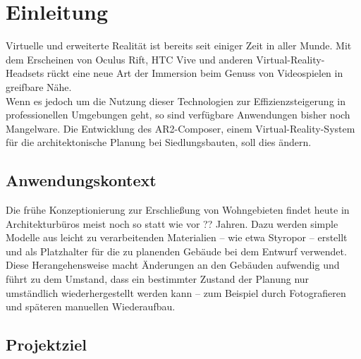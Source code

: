 \section{Einleitung}
Virtuelle und erweiterte Realität ist bereits seit einiger Zeit in aller Munde. Mit dem Erscheinen von Oculus Rift, HTC Vive und anderen Virtual-Reality-Headsets rückt eine neue Art der Immersion beim Genuss von Videospielen in greifbare Nähe.\\
Wenn es jedoch um die Nutzung dieser Technologien zur Effizienzsteigerung in professionellen Umgebungen geht, so sind verfügbare Anwendungen bisher noch Mangelware.
Die Entwicklung des AR2-Composer, einem Virtual-Reality-System für die architektonische Planung bei Siedlungsbauten, soll dies ändern.
\subsection{Anwendungskontext}
Die frühe Konzeptionierung zur Erschließung von Wohngebieten findet heute in Architekturbüros meist noch so statt wie vor {\color{red}??} Jahren. Dazu werden simple Modelle aus leicht zu verarbeitenden Materialien -- wie etwa Styropor -- erstellt und als Platzhalter für die zu planenden Gebäude bei dem Entwurf verwendet.\\
Diese Herangehensweise macht Änderungen an den Gebäuden aufwendig und führt zu dem Umstand, dass ein bestimmter Zustand der Planung nur umständlich wiederhergestellt werden kann -- zum Beispiel durch Fotografieren und späteren manuellen Wiederaufbau.
\subsection{Projektziel}